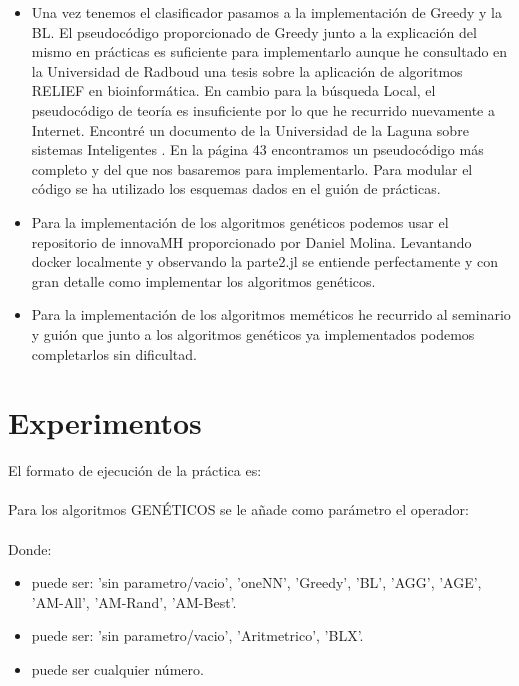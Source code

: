 \begin{itemize}
	\item Una vez tenemos el clasificador pasamos a la implementación de Greedy y la BL. El pseudocódigo proporcionado de Greedy junto a la explicación del mismo en prácticas es suficiente para implementarlo aunque he consultado en la Universidad de Radboud \cite{runl} una tesis sobre la aplicación de algoritmos RELIEF en bioinformática. En cambio para la búsqueda Local, el pseudocódigo de teoría es insuficiente por lo que he recurrido nuevamente a Internet. Encontré un documento de la Universidad de la Laguna sobre sistemas Inteligentes \cite{ull}. En la página 43 encontramos un pseudocódigo más completo y del que nos basaremos para implementarlo. Para modular el código se ha utilizado los esquemas dados en el guión de prácticas.
	
	\item Para la implementación de los algoritmos genéticos podemos usar el repositorio de innovaMH \cite{innovaMH} proporcionado por Daniel Molina. Levantando docker localmente y observando la parte2.jl se entiende perfectamente y con gran detalle como implementar los algoritmos genéticos. 
	
	\item Para la implementación de los algoritmos meméticos he recurrido al seminario y guión que junto a los algoritmos genéticos ya implementados podemos completarlos sin dificultad.
\end{itemize}

\section{Experimentos}
El formato de ejecución de la práctica es:\\
\\

Para los algoritmos GENÉTICOS se le añade como parámetro el operador:\\
\\

Donde:
\begin{itemize}
	\item {} puede ser: 'sin parametro/vacio', 'oneNN', 'Greedy', 'BL', 'AGG', 'AGE', 'AM-All', 'AM-Rand', 'AM-Best'.
	
	\item {} puede ser: 'sin parametro/vacio', 'Aritmetrico', 'BLX'.
	\item {} puede ser cualquier número.
\end{itemize}

